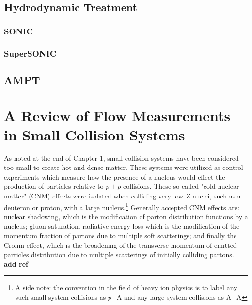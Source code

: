 \subsection{Hydrodynamic Treatment}

\subsubsection{SONIC}

\subsubsection{SuperSONIC}

\subsection{AMPT}

\fi

\section{A Review of Flow Measurements in Small Collision Systems}


As noted at the end of Chapter 1, small collision systems have been considered too small to create hot and dense matter. These systems were utilized as control experiments which measure how the presence of a nucleus would effect the production of particles relative to $p+p$ collisions. These so called "cold nuclear matter" (CNM) effects were isolated when colliding very low $Z$ nuclei, such as a deuteron or proton, with a large nucleus.\footnote{ A side note: the convention in the field of heavy ion physics is to label any such small system collisions as $p$+A and any large system collisions as A+A} Generally accepted CNM effects are: nuclear shadowing, which is the modification of parton distribution functions by a nucleus; gluon saturation, radiative energy loss which is the modification of the momentum fraction of partons due to multiple soft scatterings; and finally the Cronin effect, which is the broadening of the transverse momentum of emitted particles distribution due to multiple scatterings of initially colliding partons. \textbf{add ref}  

